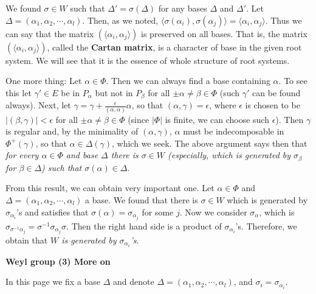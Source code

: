 \documentclass{article}
\begin{document}
We found $\sigma \in W$ such that $\Delta' = \sigma(\Delta)$ for any bases $\Delta$ and $\Delta'$.
Let $\Delta = (\alpha_1, \alpha_2, \cdots, \alpha_l)$.
Then, as we noted, $\langle \sigma(\alpha_i), \sigma(\alpha_j) \rangle = \langle \alpha_i, \alpha_j \rangle$.
Thus we can say that the matrix $(\langle \alpha_i, \alpha_j \rangle)$ is preserved on all bases.
That is, the matrix $(\langle \alpha_i, \alpha_j \rangle)$, called the \textbf{Cartan matrix}, is a character of base in the given root system.
We will see that it is the essence of whole structure of root systems.

One more thing: Let $\alpha \in \Phi$.
Then we can always find a base containing $\alpha$.
To see this let $\gamma' \in E$ be in $P_\alpha$ but not in $P_\beta$ for all $\pm \alpha \ne \beta \in \Phi$ (such $\gamma'$ can be found always).
Next, let $\gamma = \gamma + \frac{\epsilon}{(\alpha, \alpha)} \alpha$, so that $(\alpha, \gamma) = \epsilon$, where $\epsilon$ is chosen to be $|(\beta, \gamma)| < \epsilon$ for all $\pm \alpha \ne \beta \in \Phi$ (since $|\Phi|$ is finite, we can choose such $\epsilon$).
Then $\gamma$ is regular and, by the minimality of $(\alpha, \gamma)$, $\alpha$ must be indecomposable in $\Phi^+(\gamma)$, so that $\alpha \in \Delta(\gamma)$, which we seek.
The above argument says then that \textit{for every $\alpha \in \Phi$ and base $\Delta$ there is $\sigma \in W$ (especially, which is generated by $\sigma_\beta$ for $\beta \in \Delta$) such that $\sigma(\alpha) \in \Delta$}.

From this result, we can obtain very important one.
Let $\alpha \in \Phi$ and $\Delta = (\alpha_1, \alpha_2, \cdots, \alpha_l)$ a base.
We found that there is $\sigma \in W$ which is generated by $\sigma_{\alpha_i}$'s and satisfies that $\sigma(\alpha) = \sigma_{\alpha_j}$ for some $j$.
Now we consider $\sigma_\alpha$, which is $\sigma_{\sigma^{-1} \alpha_j} = \sigma^{-1} \sigma_{\alpha_j} \sigma$.
Then the right hand side is a product of $\sigma_{\alpha_i}$'s.
Therefore, we obtain that \textit{$W$ is generated by $\sigma_{\alpha_i}$'s}.

\newpage

\textbf{Weyl group (3) More on}

In this page we fix a base $\Delta$ and denote $\Delta = (\alpha_1, \alpha_2, \cdots, \alpha_l)$, and $\sigma_i = \sigma_{\alpha_i}$.
\end{document}

